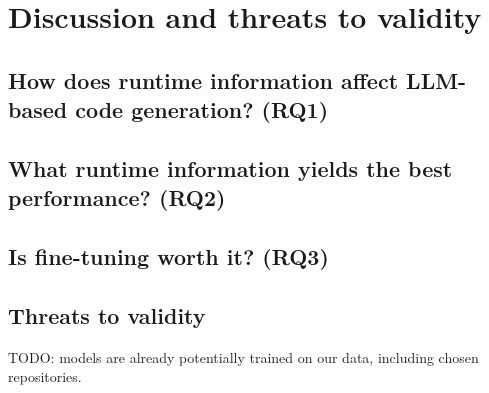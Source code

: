 \chapter{Discussion and threats to validity}
\label{ch:discussion}

\section{How does runtime information affect LLM-based code generation? (RQ1)}
\section{What runtime information yields the best performance? (RQ2)}
\section{Is fine-tuning worth it? (RQ3)}
\section{Threats to validity}
TODO: models are already potentially trained on our data, including chosen repositories. 